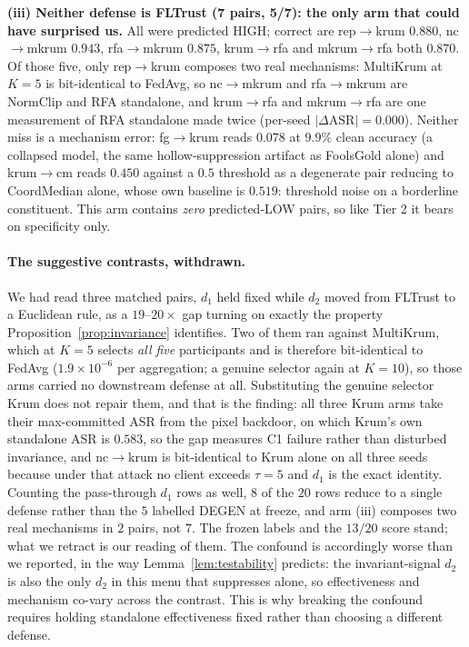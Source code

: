 \documentclass{article}
\begin{document}
\textbf{(iii) Neither defense is FLTrust (7 pairs, 5/7): the only arm that could have surprised us.} All were predicted HIGH; correct are rep$\to$krum $0.880$, nc$\to$mkrum $0.943$, rfa$\to$mkrum $0.875$, krum$\to$rfa and mkrum$\to$rfa both $0.870$. Of those five, only rep$\to$krum composes two real mechanisms: MultiKrum at $K{=}5$ is bit-identical to FedAvg, so nc$\to$mkrum and rfa$\to$mkrum are NormClip and RFA standalone, and krum$\to$rfa and mkrum$\to$rfa are one measurement of RFA standalone made twice (per-seed $|\Delta\mathrm{ASR}| = 0.000$). Neither miss is a mechanism error: fg$\to$krum reads $0.078$ at $9.9\%$ clean accuracy (a collapsed model, the same hollow-suppression artifact as FoolsGold alone) and krum$\to$cm reads $0.450$ against a $0.5$ threshold as a degenerate pair reducing to CoordMedian alone, whose own baseline is $0.519$: threshold noise on a borderline constituent. This arm contains \emph{zero} predicted-LOW pairs, so like Tier 2 it bears on specificity only.

\paragraph{The suggestive contrasts, withdrawn.} We had read three matched pairs, $d_1$ held fixed while $d_2$ moved from FLTrust to a Euclidean rule, as a $19$--$20\times$ gap turning on exactly the property Proposition~\ref{prop:invariance} identifies. Two of them ran against MultiKrum, which at $K{=}5$ selects \emph{all five} participants and is therefore bit-identical to FedAvg ($1.9\times10^{-6}$ per aggregation; a genuine selector again at $K{=}10$), so those arms carried no downstream defense at all. Substituting the genuine selector Krum does not repair them, and that is the finding: all three Krum arms take their max-committed ASR from the pixel backdoor, on which Krum's own standalone ASR is $0.583$, so the gap measures C1 failure rather than disturbed invariance, and nc$\to$krum is bit-identical to Krum alone on all three seeds because under that attack no client exceeds $\tau{=}5$ and $d_1$ is the exact identity. Counting the pass-through $d_1$ rows as well, $8$ of the $20$ rows reduce to a single defense rather than the $5$ labelled DEGEN at freeze, and arm (iii) composes two real mechanisms in $2$ pairs, not $7$. The frozen labels and the $13/20$ score stand; what we retract is our reading of them. The confound is accordingly worse than we reported, in the way Lemma~\ref{lem:testability} predicts: the invariant-signal $d_2$ is also the only $d_2$ in this menu that suppresses alone, so effectiveness and mechanism co-vary across the contrast. This is why breaking the confound requires holding standalone effectiveness fixed rather than choosing a different defense.
\end{document}
